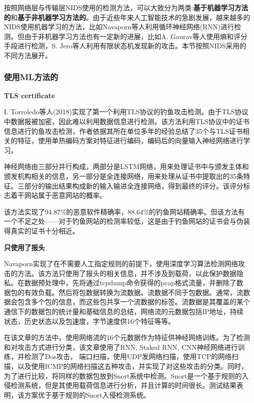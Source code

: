 \documentclass[12pt]{article} %
\begin{document}
按照网络层与传输层NIDS使用的检测方法，可以大致分为两类:\textbf{基于机器学习方法的}和\textbf{基于非机器学习方法的}。由于近些年来人工智能技术的急剧发展，越来越多的NIDS使用机器学习的方法，比如Navaporn等人利用循环神经网络(RNN)进行检测。但由于非机器学习方法也有一定新的进展，比如A. Gaurav等人使用熵和评分手段进行检测，S. Jero等人利用有限状态机发现新的攻击。本节按照NIDS采用的不同方法展开。

\subsubsection{使用ML方法的}
\label{ml}

\textbf{TLS certificate}

I. Torroledo等人(2018)实现了第一个利用TLS协议的钓鱼攻击检测。由于TLS协议中数据报被加密，因此难以利用数据信息进行检测。该方法利用TLS协议中的证书信息进行钓鱼攻击检测，作者依据其所在单位多年的经验总结了35个与TLS证书相关的特征，使用单热编码方案对特征进行编码，编码后的向量输入神经网络进行学习。

神经网络由三部分并行构成，两部分是LSTM网络，用来处理证书中与颁发主体和颁发机构相关的信息，另一部分是全连接网络，用来处理从证书中提取出的35条特征。三部分的输出结果构成新的输入输进全连接网络，得到最终的评分。该评分标志着干网站属于恶意网站的概率。

该方法实现了94.87\%的恶意软件精确率，88.64\%的钓鱼网站精确率。但该方法有一个不足之处——对于钓鱼网站的检测率较低，这是由于钓鱼网站的证书会与伪装得真实的证书十分相近。

\textbf{只使用了报头}

Navaporn实现了在不需要人工指定规则的前提下，使用深度学习算法检测网络攻击的方法。该方法只使用了报头的相关信息，并不涉及到载荷，以此保护数据隐私。在数据预处理中，先将通过tcpdump命令获得的pcap格式流量，并删除了数据包的有效负载。然后将包数据转换为流数据。流数据不同于包数据。通常，流数据会包含多个包的信息，而这些包共享一个流数据的标签。流数据是其覆盖的某个通信下的数据包的统计量和基础信息的总结，网络流的元数据包括IP地址，持续状态，历史状态以及包速度，字节速度供16个特征等等。

在该文章的方法中，使用网络流的16个元数据作为特征供神经网络训练。为了检测和对攻击方式进行分类，该文章使用了RNN, Staked RNN, CNN神经网络进行训练，并检测了Dos攻击， 端口扫描，使用UDP发网络扫描，使用TCP的网络扫描，以及使用ICMP的网络扫描这五种攻击，并实现了对这些攻击的分类。同时，为了进行比较，将同样的数据包放到Snort系统中检测。Snort是一个基于规则的入侵检测系统，但是其使用载荷信息进行分析，并且计算的时间很长。测试结果表明，该方案优于基于规则的Snort入侵检测系统。
\end{document}
